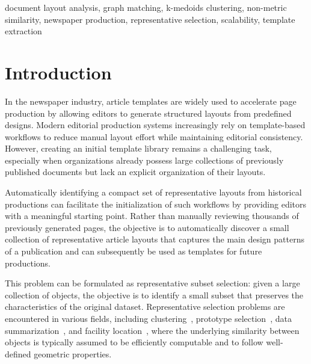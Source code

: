 \documentclass{ieeeaccess}
\begin{document}
\begin{keywords}
document layout analysis, graph matching, k-medoids clustering, non-metric similarity, newspaper production, representative selection, scalability, template extraction
\end{keywords}

\maketitle

\section{Introduction}
In the newspaper industry, article templates are widely used to accelerate page production by allowing editors to generate structured layouts from predefined designs. Modern editorial production systems increasingly rely on template-based workflows to reduce manual layout effort while maintaining editorial consistency. However, creating an initial template library remains a challenging task, especially when organizations already possess large collections of previously published documents but lack an explicit organization of their layouts.

Automatically identifying a compact set of representative layouts from historical productions can facilitate the initialization of such workflows by providing editors with a meaningful starting point. Rather than manually reviewing thousands of previously generated pages, the objective is to automatically discover a small collection of representative article layouts that captures the main design patterns of a publication and can subsequently be used as templates for future productions.

This problem can be formulated as representative subset selection: given a large collection of objects, the objective is to identify a small subset that preserves the characteristics of the original dataset. Representative selection problems are encountered in various fields, including clustering~\cite{frey2007clustering}, prototype selection~\cite{garcia2012prototype}, data summarization~\cite{lin2011docsummarization}, and facility location~\cite{shmoys1997facilitylocation}, where the underlying similarity between objects is typically assumed to be efficiently computable and to follow well-defined geometric properties.
\end{document}
